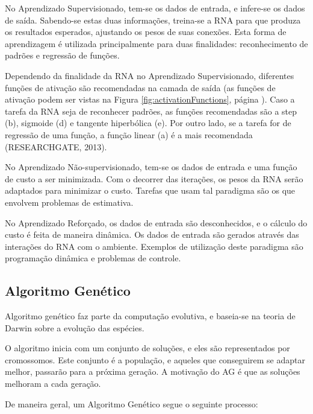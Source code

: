 \documentclass[12pt,a4paper]{article}
\begin{document}
	No Aprendizado Supervisionado,
	tem-se os dados de entrada, e infere-se os dados de saída.
	Sabendo-se estas duas informações, treina-se a RNA para que produza os resultados esperados,
	ajustando os pesos de suas conexões.
	Esta forma de aprendizagem é utilizada principalmente para duas finalidades:
	reconhecimento de padrões e regressão de funções.
	
	Dependendo da finalidade da RNA no Aprendizado Supervisionado,
	diferentes funções de ativação são recomendadas na camada de saída
	(as funções de ativação podem ser vistas na Figura \ref{fig:activationFunctions}, página \pageref{fig:activationFunctions}).
	Caso a tarefa da RNA seja de reconhecer padrões,
	as funções recomendadas são a step (b), sigmoide (d) e tangente hiperbólica (e).
	Por outro lado, se a tarefa for de regressão de uma função,
	a função linear (a) é a mais recomendada (RESEARCHGATE, 2013).
	
	No Aprendizado Não-supervisionado,
	tem-se os dados de entrada e uma função de custo a ser minimizada.
	Com o decorrer das iterações,
	os pesos da RNA serão adaptados para minimizar o custo.
	Tarefas que usam tal paradigma são os que envolvem problemas de estimativa.
	
	No Aprendizado Reforçado,
	os dados de entrada são desconhecidos,
	e o cálculo do custo é feita de maneira dinâmica.
	Os dados de entrada são gerados através das interações do RNA com o ambiente.
	Exemplos de utilização deste paradigma são
	programação dinâmica e problemas de controle.

	\FloatBarrier
	\subsection{Algoritmo Genético}
	Algoritmo genético faz parte da computação evolutiva,
	e baseia-se na teoria de Darwin sobre a evolução das espécies.
	
	O algoritmo inicia com um conjunto de soluções,
	e eles são representados por cromossomos.
	Este conjunto é a população, e aqueles que conseguirem se adaptar melhor,
	passarão para a próxima geração.
	A motivação do AG é que as soluções melhoram a cada geração.
	
	De maneira geral, um Algoritmo Genético segue o seguinte processo:
	
\end{document}

